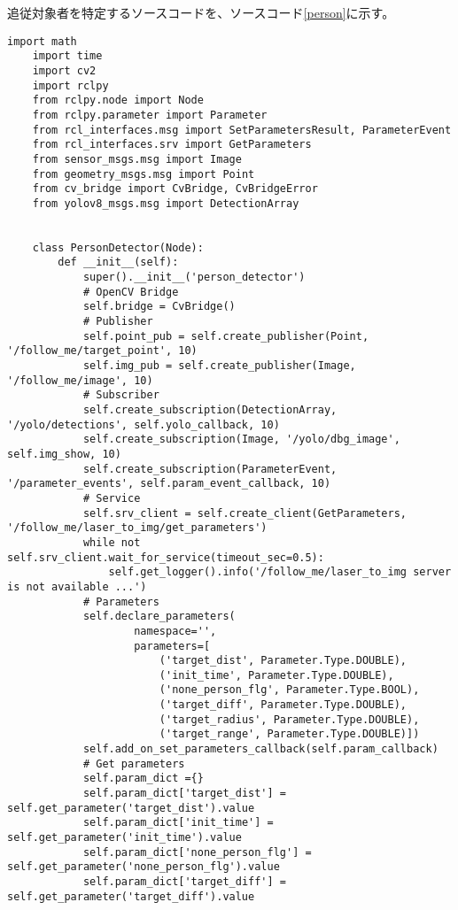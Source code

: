 追従対象者を特定するソースコードを、ソースコード\ref{person}に示す。
\begin{lstlisting}[caption=person\_detector.py, label=person]
    import math
    import time
    import cv2
    import rclpy
    from rclpy.node import Node
    from rclpy.parameter import Parameter
    from rcl_interfaces.msg import SetParametersResult, ParameterEvent
    from rcl_interfaces.srv import GetParameters
    from sensor_msgs.msg import Image
    from geometry_msgs.msg import Point
    from cv_bridge import CvBridge, CvBridgeError
    from yolov8_msgs.msg import DetectionArray
    
    
    class PersonDetector(Node):
        def __init__(self):
            super().__init__('person_detector')
            # OpenCV Bridge
            self.bridge = CvBridge()
            # Publisher
            self.point_pub = self.create_publisher(Point, '/follow_me/target_point', 10)
            self.img_pub = self.create_publisher(Image, '/follow_me/image', 10)
            # Subscriber
            self.create_subscription(DetectionArray, '/yolo/detections', self.yolo_callback, 10)
            self.create_subscription(Image, '/yolo/dbg_image', self.img_show, 10)
            self.create_subscription(ParameterEvent, '/parameter_events', self.param_event_callback, 10)
            # Service
            self.srv_client = self.create_client(GetParameters, '/follow_me/laser_to_img/get_parameters')
            while not self.srv_client.wait_for_service(timeout_sec=0.5):
                self.get_logger().info('/follow_me/laser_to_img server is not available ...')
            # Parameters
            self.declare_parameters(
                    namespace='',
                    parameters=[
                        ('target_dist', Parameter.Type.DOUBLE),
                        ('init_time', Parameter.Type.DOUBLE),
                        ('none_person_flg', Parameter.Type.BOOL),
                        ('target_diff', Parameter.Type.DOUBLE),
                        ('target_radius', Parameter.Type.DOUBLE),
                        ('target_range', Parameter.Type.DOUBLE)])
            self.add_on_set_parameters_callback(self.param_callback)
            # Get parameters
            self.param_dict ={}
            self.param_dict['target_dist'] = self.get_parameter('target_dist').value
            self.param_dict['init_time'] = self.get_parameter('init_time').value
            self.param_dict['none_person_flg'] = self.get_parameter('none_person_flg').value
            self.param_dict['target_diff'] = self.get_parameter('target_diff').value

\end{lstlisting}
